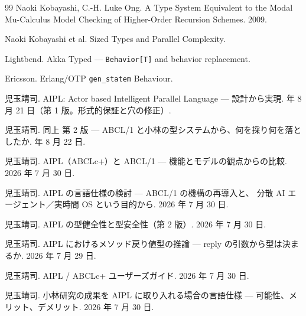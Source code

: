 \documentclass[11pt,a4paper]{ltjsarticle}
\theoremstyle{definition}
\theoremstyle{remark}
\begin{document}
\begin{thebibliography}{99}
Naoki Kobayashi, C.-H. Luke Ong.
\newblock A Type System Equivalent to the Modal Mu-Calculus Model Checking
of Higher-Order Recursion Schemes. 2009.

Naoki Kobayashi et al.
\newblock Sized Types and Parallel Complexity.

Lightbend.
\newblock Akka Typed --- \texttt{Behavior[T]} and behavior replacement.

Ericsson.
\newblock Erlang/OTP \texttt{gen\_statem} Behaviour.

児玉靖司.
\newblock AIPL: Actor based Intelligent Parallel Language --- 設計から実現.
 年 8 月 21 日（第 1 版。形式的保証と穴の修正）.

児玉靖司.
\newblock 同上 第 2 版 --- ABCL/1 と小林の型システムから、何を採り何を落としたか.
 年 8 月 22 日.

児玉靖司.
\newblock AIPL（ABCLc+）と ABCL/1 --- 機能とモデルの観点からの比較. 2026 年 7 月 30 日.

児玉靖司.
\newblock AIPL の言語仕様の検討 --- ABCL/1 の機構の再導入と、
分散 AI エージェント／実時間 OS という目的から. 2026 年 7 月 30 日.

児玉靖司.
\newblock AIPL の型健全性と型安全性（第 2 版）. 2026 年 7 月 30 日.

児玉靖司.
\newblock AIPL におけるメソッド戻り値型の推論 --- reply の引数から型は決まるか.
2026 年 7 月 29 日.

児玉靖司.
\newblock AIPL / ABCLc+ ユーザーズガイド. 2026 年 7 月 30 日.

児玉靖司.
\newblock 小林研究の成果を AIPL に取り入れる場合の言語仕様 ---
可能性、メリット、デメリット. 2026 年 7 月 30 日.

\end{thebibliography}
\end{document}

